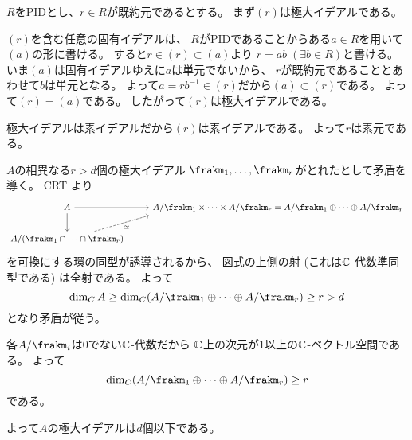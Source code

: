 \documentclass[report]{jlreq}
\begin{document}

\begin{answer}
    $R$をPIDとし、$r \in R$が既約元であるとする。
    まず$(r)$は極大イデアルである。
    \begin{innerproof}
        $(r)$を含む任意の固有イデアルは、
        $R$がPIDであることからある$a \in R$を用いて$(a)$の形に書ける。
        すると$r \in (r) \subset (a)$より
        $r = ab \; (\exists b \in R)$と書ける。
        いま$(a)$は固有イデアルゆえに$a$は単元でないから、
        $r$が既約元であることとあわせて$b$は単元となる。
        よって$a = rb^{-1} \in (r)$だから$(a) \subset (r)$である。
        よって$(r) = (a)$である。
        したがって$(r)$は極大イデアルである。
    \end{innerproof}
    極大イデアルは素イデアルだから$(r)$は素イデアルである。
    よって$r$は素元である。
\end{answer}



\begin{answer}
    $A$の相異なる$r > d$個の極大イデアル
    $\frakm_1, \dots, \frakm_r$がとれたとして矛盾を導く。
    CRT より
    \begin{equation}
        \begin{tikzcd}
            A \ar{d} \ar{r}
                & A / \frakm_1 \times \cdots \times A / \frakm_r
                = A / \frakm_1 \oplus \cdots \oplus A / \frakm_r \\
            A / (\frakm_1 \cap \cdots \cap \frakm_r)
                \ar[dashed, end anchor=south west]{ru}[swap]{\cong}
        \end{tikzcd}
    \end{equation}
    を可換にする環の同型が誘導されるから、
    図式の上側の射 (これは$\mathbb{C}$-代数準同型である) は全射である。
    よって
    \begin{equation}
        \dim_C A
            \ge \dim_C (
                A / \frakm_1 \oplus \cdots \oplus A / \frakm_r
            )
            \ge r
            > d
    \end{equation}
    となり矛盾が従う。
    \begin{innerproof}
        各$A / \frakm_i$は$0$でない$\mathbb{C}$-代数だから
        $\mathbb{C}$上の次元が$1$以上の$\mathbb{C}$-ベクトル空間である。
        よって
        \begin{equation}
            \dim_C (
                A / \frakm_1 \oplus \cdots \oplus A / \frakm_r
            ) \ge r
        \end{equation}
        である。
    \end{innerproof}
    よって$A$の極大イデアルは$d$個以下である。
\end{answer}
\end{document}
